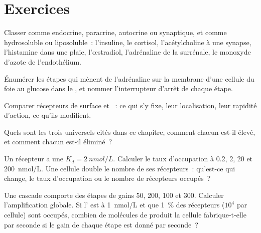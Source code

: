 \section{Exercices}

\begin{exercise}[$\star$]\label{exo:b2:cell-signalling:1}
Classer comme endocrine, paracrine, autocrine ou synaptique, et comme
hydrosoluble ou liposoluble~: l'insuline, le cortisol, l'acétylcholine à
une synapse, l'histamine dans une plaie, l'œstradiol, l'adrénaline de la
surrénale, le monoxyde d'azote de l'endothélium.
\end{exercise}

\begin{exercise}[$\star$]\label{exo:b2:cell-signalling:2}
Énumérer les étapes qui mènent de l'adrénaline sur la membrane d'une
cellule du foie au glucose dans le , et nommer l'interrupteur
d'arrêt de chaque étape.
\end{exercise}

\begin{exercise}[$\star$]\label{exo:b2:cell-signalling:3}
Comparer récepteurs de surface et ~: ce qui s'y
fixe, leur localisation, leur rapidité d'action, ce qu'ils modifient.
\end{exercise}

\begin{exercise}[$\star$]\label{exo:b2:cell-signalling:4}
Quels sont les trois  universels cités dans ce
chapitre, comment chacun est-il élevé, et comment chacun est-il
éliminé~?
\end{exercise}

\begin{exercise}[$\star\star$]\label{exo:b2:cell-signalling:5}
Un récepteur a une $K_d = \qty{2}{nmol/L}$. Calculer le taux d'occupation
à 0.2, 2, 20 et \qty{200}{nmol/L}. Une cellule double le nombre de ses
récepteurs~: qu'est-ce qui change, le taux d'occupation ou le nombre de
récepteurs occupés~?
\end{exercise}

\begin{exercise}[$\star\star$]\label{exo:b2:cell-signalling:6}
Une cascade comporte des étapes de gains 50, 200, 100 et 300. Calculer
l'amplification globale. Si l' est à \qty{1}{nmol/L} et que
\qty{1}{\%} des récepteurs ($10^{4}$ par cellule) sont occupés, combien
de molécules de produit la cellule fabrique-t-elle par seconde si le
gain de chaque étape est donné par seconde~?
\end{exercise}

